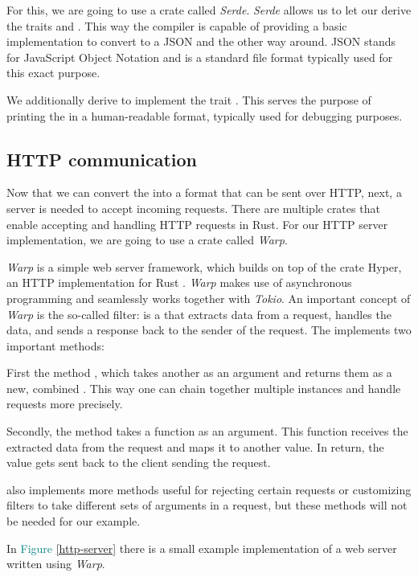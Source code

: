 For this, we are going to use a crate called \textit{Serde}. \textit{Serde} allows us to let our  derive
the traits  and . This way the compiler is capable of providing a basic
implementation to convert  to a JSON  and the other way around. JSON stands for JavaScript
Object Notation and is a standard file format typically used for this exact purpose.

We additionally derive  to implement the trait . This serves the purpose of printing
the  in a human-readable format, typically used for debugging purposes.

\subsection{HTTP communication}
Now that we can convert the  into a format that can be sent over HTTP, next, a server is needed to accept
incoming requests. There are multiple crates that enable accepting and handling HTTP requests in Rust. For our HTTP
server implementation, we are going to use a crate called \textit{Warp}.

\textit{Warp} is a simple web server framework, which builds on top of the crate Hyper, an HTTP implementation for Rust
\cite{warp-doc}. \textit{Warp} makes use of asynchronous programming and seamlessly works together with \textit{Tokio}.
An important concept of \textit{Warp} is the so-called filter:  is a  that extracts
data from a request, handles the data, and sends a response back to the sender of the request. The 
implements two important methods:

First the method , which takes another  as an argument and returns
them as a new, combined . This way one can chain together multiple  instances and handle
requests more precisely.

Secondly, the method  takes a function as an argument. This function receives the extracted data from the
request and maps it to another value. In return, the value gets sent back to the client sending the request.

 also implements more methods useful for rejecting certain requests or customizing filters to take
different sets of arguments in a request, but these methods will not be needed for our example.

In \textcolor{teal}{Figure \ref{http-server}} there is a small example implementation of a web server written using
\textit{Warp}.

